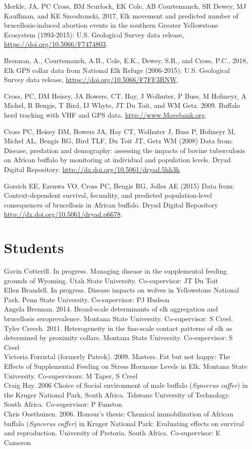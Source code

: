 \documentclass[12pt,]{article}
\begin{document}
Merkle, JA, PC Cross, BM Scurlock, EK Cole, AB Courtemanch, SR Dewey, MJ
Kauffman, and KE Szcodronski, 2017, Elk movement and predicted number of
brucellosis-induced abortion events in the southern Greater Yellowstone
Ecosystem (1993-2015): U.S. Geological Survey data release,
\url{https://doi.org/10.5066/F7474803}.

Brennan, A., Courtemanch, A.B., Cole, E.K., Dewey, S.R., and Cross,
P.C., 2018, Elk GPS collar data from National Elk Refuge (2006-2015):
U.S. Geological Survey data release,
\url{https://doi.org/10.5066/F7FF3RNW}.

Cross, PC, DM Heisey, JA Bowers, CT. Hay, J Wolhuter, P Buss, M Hofmeyr,
A Michel, R Bengis, T Bird, IJ Whyte, JT Du Toit, and WM Getz. 2009.
Buffalo herd tracking with VHF and GPS data.
\url{http://www.Movebank.org}.

Cross PC, Heisey DM, Bowers JA, Hay CT, Wolhuter J, Buss P, Hofmeyr M,
Michel AL, Bengis RG, Bird TLF, Du Toit JT, Getz WM (2008) Data from:
Disease, predation and demography: assessing the impacts of bovine
tuberculosis on African buffalo by monitoring at individual and
population levels. Dryad Digital Repository.
\url{http://dx.doi.org/10.5061/dryad.5hh3h}

Gorsich EE, Ezenwa VO, Cross PC, Bengis RG, Jolles AE (2015) Data from:
Context-dependent survival, fecundity, and predicted population-level
consequences of brucellosis in African buffalo. Dryad Digital Repository
\url{http://dx.doi.org/10.5061/dryad.p6678}.

\hypertarget{students}{%
\section{Students}\label{students}}

Gavin Cotterill. In progress. Managing disease in the supplemental
feeding grounds of Wyoming. Utah State University. Co-supervisor: JT Du
Toit\\
Ellen Brandell. In progress. Disease impacts on wolves in Yellowstone
National Park. Penn State University. Co-supervisor: PJ Hudson\\
Angela Brennan. 2014. Broad-scale determinants of elk aggregation and
brucellosis seroprevalence. Montana State University. Co-supervisor: S
Creel.\\
Tyler Creech. 2011. Heterogeneity in the fine-scale contact patterns of
elk as determined by proximity collars. Montana State University.
Co-supervisor: S Creel\\
Victoria Forristal (formerly Patrek). 2009. Masters. Fat but not happy:
The Effects of Supplemental Feeding on Stress Hormone Levels in Elk.
Montana State University. Co-supervisors: M Taper, S Creel\\
Craig Hay. 2006 Choice of Social environment of male buffalo
(\emph{Syncerus caffer}) in the Kruger National Park, South Africa.
Tshwane University of Technology. South Africa. Co-supervisor: P
Funston\\
Chris Oosthuizen. 2006. Honour's thesis: Chemical immobilization of
African buffalo (\emph{Syncerus caffer}) in Kruger National Park:
Evaluating effects on survival and reproduction. University of Pretoria.
South Africa. Co-supervisor: E Cameron
\end{document}
